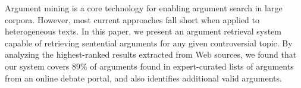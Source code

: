 Argument mining is a core technology for enabling argument search in large corpora. However, most current approaches fall short when applied to heterogeneous texts. In this paper, we present an argument retrieval system capable of retrieving sentential arguments for any given controversial topic. By analyzing the highest-ranked results extracted from Web sources, we found that our system covers 89\% of arguments found in expert-curated lists of arguments from an online debate portal, and also identifies additional valid arguments.
